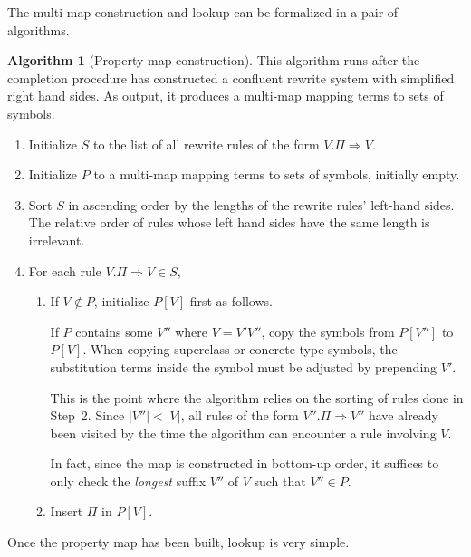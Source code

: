 \documentclass[a4paper,headsepline,bibliography=totoc,toc=flat,fleqn,twoside=semi]{scrbook}
\theoremstyle{definition}
\theoremstyle{definition}
\theoremstyle{definition}
\newtheorem{algorithm}{Algorithm}[chapter]
\begin{document}
The multi-map construction and lookup can be formalized in a pair of algorithms.
\begin{algorithm}[Property map construction]\label{propmapconsalgo}
This algorithm runs after the completion procedure has constructed a confluent rewrite system with
simplified right hand sides. As output, it produces a multi-map mapping terms to sets of
symbols.

\begin{enumerate}
\item Initialize $S$ to the list of all rewrite rules of the form $V.\Pi\Rightarrow V$.
\item Initialize $P$ to a multi-map mapping terms to sets of symbols, initially empty.
\item Sort $S$ in ascending order by the lengths of the rewrite rules' left-hand sides. The
relative order of rules whose left hand sides have the same length is irrelevant.
\item For each rule $V.\Pi\Rightarrow V\in S$,
\begin{enumerate}
\item If $V\notin P$, initialize $P[V]$ first as follows.

If $P$ contains some $V''$ where $V=V'V''$, copy the symbols from $P[V'']$ to $P[V]$.
When copying superclass or concrete type symbols, the substitution
terms inside the symbol must be adjusted by prepending $V'$.

This is the point where the algorithm relies on the sorting of rules done in Step~2. Since
$|V''|<|V|$, all rules of the form $V''.\Pi\Rightarrow V''$ have already been visited by the time
the algorithm can encounter a rule involving $V$.

In fact, since the map is constructed in
bottom-up order, it suffices to only check the \emph{longest} suffix $V''$ of $V$ such that $V''\in P$.

\item Insert $\Pi$ in $P[V]$.
\end{enumerate}
\end{enumerate}
\end{algorithm}
Once the property map has been built, lookup is very simple.
\end{document}
